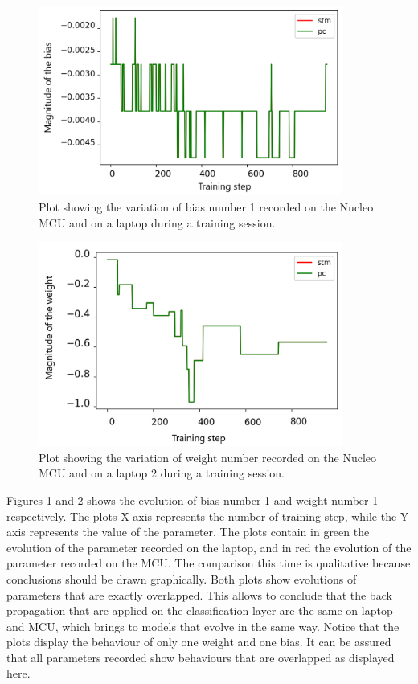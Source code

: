 \documentclass[12pt]{report}
\begin{document}
\begin{figure}[h!]
    \centering
    \includegraphics[width=100mm]{Figures/Chapter5/bias_example.png} 
    \caption{Plot showing the variation of bias number 1 recorded on the Nucleo MCU and on a laptop during a training session.}
    \label{fig:comparison_bias}    
\end{figure}

\begin{figure}[h!]
    \centering
    \includegraphics[width=100mm]{Figures/Chapter5/weight_example.png} 
    \caption{Plot showing the variation of weight number recorded on the Nucleo MCU and on a laptop 2 during a training session.}
    \label{fig:comparison_weights}    
\end{figure}

Figures \ref{fig:comparison_bias} and \ref{fig:comparison_weights} shows the evolution of bias number 1 and weight number 1 respectively. The plots X axis represents the number of training step, while the Y axis represents the value of the parameter. The plots contain in green the evolution of the parameter recorded on the laptop, and in red the evolution of the parameter recorded on the MCU. The comparison this time is qualitative because conclusions should be drawn graphically. Both plots show evolutions of parameters that are exactly overlapped. This allows to conclude that the back propagation that are applied on the classification layer are the same on laptop and MCU, which brings to models that evolve in the same way. Notice that the plots display the behaviour of only one weight and one bias. It can be assured that all parameters recorded show behaviours that are overlapped as displayed here.
\end{document}
